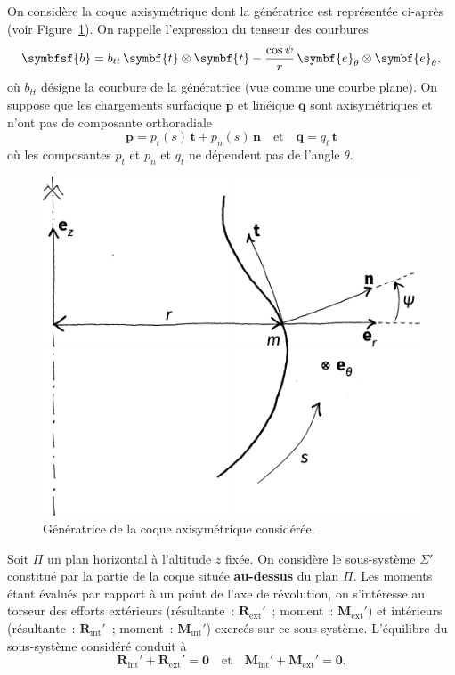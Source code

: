 \documentclass[
  a4paper,
  DIV=11,
  numbers=noendperiod]{scrreprt}
\newcommand{\external}{\mathrm{ext}}
\newcommand{\internal}{\mathrm{int}}
\newcommand{\tens}[1]{\symbfsf{#1}}
\renewcommand{\vec}[1]{\symbf{#1}}
\begin{document}
On considère la coque axisymétrique dont la génératrice est représentée
ci-après (voir Figure~\ref{fig-20230320112648}). On rappelle
l'expression du tenseur des courbures \[
\tens{b} = b_{tt} \, \vec{t} \otimes \vec{t} - \frac{\cos \psi}{r} \, \vec{e}_\theta \otimes \vec{e}_\theta,
\] où \(b_{tt}\) désigne la courbure de la génératrice (vue comme une
courbe plane). On suppose que les chargements surfacique \(\vec{p}\) et
linéique \(\vec{q}\) sont axisymétriques et n'ont pas de composante
orthoradiale \[
\vec{p} = p_t(s) \, \vec{t} + p_n(s) \, \vec{n} \quad \text{et} \quad
\vec{q} = q_t \, \vec{t}
\] où les composantes \(p_t\) et \(p_n\) et \(q_t\) ne dépendent pas de
l'angle \(\theta\).

\begin{figure}

{\centering \includegraphics{./croquis/fig20230307165827.pdf}

}

\caption{\label{fig-20230320112648}Génératrice de la coque axisymétrique
considérée.}

\end{figure}

Soit \(\Pi\) un plan horizontal à l'altitude \(z\) fixée. On considère
le sous-système \(\Sigma'\) constitué par la partie de la coque située
\textbf{au-dessus} du plan \(\Pi\). Les moments étant évalués par
rapport à un point de l'axe de révolution, on s'intéresse au torseur des
efforts extérieurs (résultante~: \(\vec{R}_\external'\)~; moment~:
\(\vec{M}_\external'\)) et intérieurs (résultante~:
\(\vec{R}_\internal'\)~; moment~: \(\vec{M}_\internal'\)) exercés sur ce
sous-système. L'équilibre du sous-système considéré conduit à \[
\vec{R}_\internal' + \vec{R}_\external' = \vec{0}
\quad \text{et} \quad
\vec{M}_\internal' + \vec{M}_\external' = \vec{0}.
\]
\end{document}
